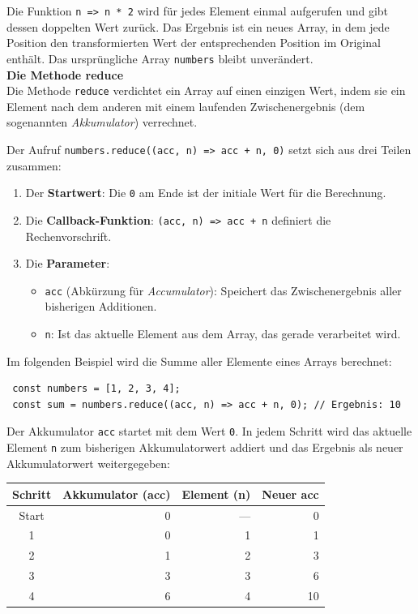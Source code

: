 Die Funktion \texttt{n => n * 2} wird für jedes Element einmal aufgerufen und gibt dessen doppelten Wert zurück. Das Ergebnis ist ein neues Array, in dem jede Position den transformierten Wert der entsprechenden Position im Original enthält. Das ursprüngliche Array \texttt{numbers} bleibt unverändert.\\

\textbf{Die Methode reduce}\\
Die Methode \texttt{reduce} verdichtet ein Array auf einen einzigen Wert, indem sie ein Element nach dem anderen mit einem laufenden Zwischenergebnis (dem sogenannten \textit{Akkumulator}) verrechnet. 

Der Aufruf \texttt{numbers.reduce((acc, n) => acc + n, 0)} setzt sich aus drei Teilen zusammen:
\begin{enumerate}
	\item Der \textbf{Startwert}: Die \texttt{0} am Ende ist der initiale Wert für die Berechnung.
	\item Die \textbf{Callback-Funktion}: \texttt{(acc, n) => acc + n} definiert die Rechenvorschrift.
	\item Die \textbf{Parameter}:
	\begin{itemize}
		\item \texttt{acc} (Abkürzung für \textit{Accumulator}): Speichert das Zwischenergebnis aller bisherigen Additionen.
		\item \texttt{n}: Ist das aktuelle Element aus dem Array, das gerade verarbeitet wird.
	\end{itemize}
\end{enumerate}

Im folgenden Beispiel wird die Summe aller Elemente eines Arrays berechnet:
\begin{verbatim}
 const numbers = [1, 2, 3, 4];
 const sum = numbers.reduce((acc, n) => acc + n, 0); // Ergebnis: 10
\end{verbatim}

Der Akkumulator \texttt{acc} startet mit dem Wert \texttt{0}. In jedem Schritt wird das aktuelle Element \texttt{n} zum bisherigen Akkumulatorwert addiert und das Ergebnis als neuer Akkumulatorwert weitergegeben:

\begin{table}[h]
	\centering
	\begin{tabular}{|c|r|r|r|}
		\hline
		\textbf{Schritt} & \textbf{Akkumulator (acc)} & \textbf{Element (n)} & \textbf{Neuer acc} \\ \hline
		Start & 0 & --- & 0 \\ \hline
		1 & 0 & 1 & 1 \\ \hline
		2 & 1 & 2 & 3 \\ \hline
		3 & 3 & 3 & 6 \\ \hline
		4 & 6 & 4 & 10 \\ \hline
	\end{tabular}
\end{table}
\FloatBarrier

